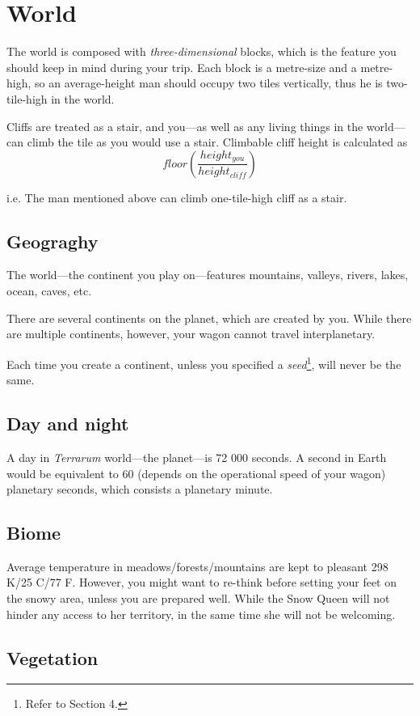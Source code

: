 \documentclass[stock,9pt,nohan]{oblivoir}
\begin{document}
\section{World}
The world is composed with \emph{three-dimensional} blocks, which is the feature you should keep in mind during your trip. Each block is a metre-size and a metre-high, so an average-height man should occupy two tiles vertically, thus he is two-tile-high in the world.

Cliffs are treated as a stair, and you---as well as any living things in the world---can climb the tile as you would use a stair. Climbable cliff height is calculated as $$ floor( \frac{height_{you}}{height_{cliff}} ) $$

i.e. The man mentioned above can climb one-tile-high cliff as a stair.

	\subsection{Geograghy}
	The world---the continent you play on---features mountains, valleys, rivers, lakes, ocean, caves, etc.
	
	There are several continents on the planet, which are created by you. While there are multiple continents, however, your wagon cannot travel interplanetary.
	
	Each time you create a continent, unless you specified a \emph{seed}\footnote{Refer to Section 4.}, will never be the same.
	
	\subsection{Day and night}
	A day in \emph{Terrarum} world---the planet---is 72 000 seconds. A second in Earth would be equivalent to 60 (depends on the operational speed of your wagon) planetary seconds, which consists a planetary minute.
	
	\subsection{Biome}
	Average temperature in meadows\slash forests\slash mountains are kept to pleasant 298 K\slash 25 \degree{}C\slash 77 \degree{}F. However, you might want to re-think before setting your feet on the snowy area, unless you are prepared well. While the Snow Queen %
will not hinder any access to her territory, in the same time she will not be welcoming.
	
	\subsection{Vegetation}
	
\end{document}
